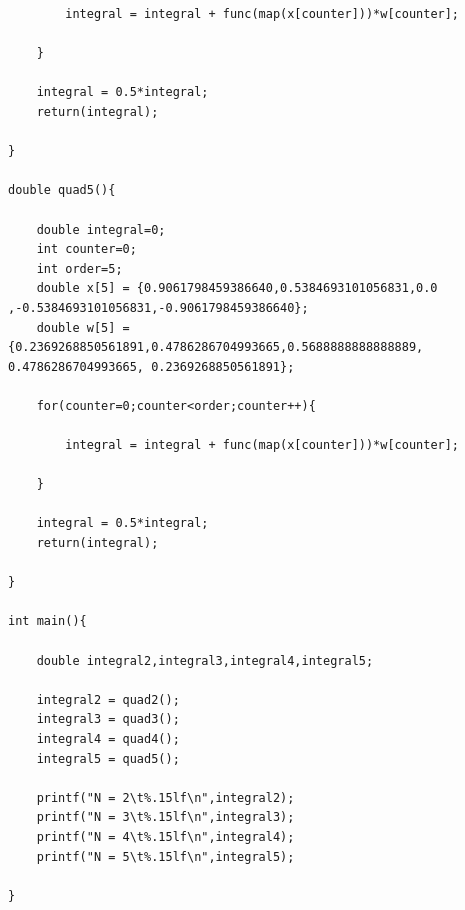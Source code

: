 \documentclass[12pt]{article}
\begin{document}
\begin{verbatim}
		integral = integral + func(map(x[counter]))*w[counter];

	}

	integral = 0.5*integral;
	return(integral);

}

double quad5(){

	double integral=0;
	int counter=0;
	int order=5;
	double x[5] = {0.9061798459386640,0.5384693101056831,0.0	       ,-0.5384693101056831,-0.9061798459386640};
	double w[5] = {0.2369268850561891,0.4786286704993665,0.5688888888888889, 0.4786286704993665, 0.2369268850561891};

	for(counter=0;counter<order;counter++){

		integral = integral + func(map(x[counter]))*w[counter];

	}

	integral = 0.5*integral;
	return(integral);

}

int main(){

	double integral2,integral3,integral4,integral5;

	integral2 = quad2();
	integral3 = quad3();
	integral4 = quad4();
	integral5 = quad5();

	printf("N = 2\t%.15lf\n",integral2);
	printf("N = 3\t%.15lf\n",integral3);
	printf("N = 4\t%.15lf\n",integral4);
	printf("N = 5\t%.15lf\n",integral5);

}
\end{verbatim}
\end{document}
